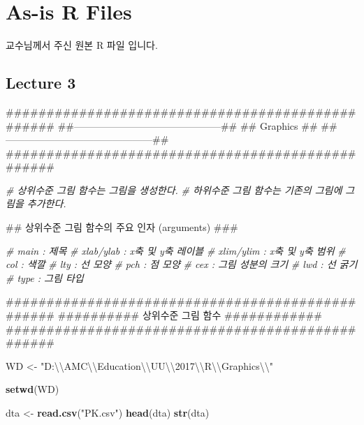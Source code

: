 \documentclass[11pt,]{krantz}
\makeatletter
\newenvironment{Shaded}{\begin{snugshade}}{\end{snugshade}}
\newcommand{\KeywordTok}[1]{\textcolor[rgb]{0.13,0.29,0.53}{\textbf{#1}}}
\newcommand{\CharTok}[1]{\textcolor[rgb]{0.31,0.60,0.02}{#1}}
\newcommand{\StringTok}[1]{\textcolor[rgb]{0.31,0.60,0.02}{#1}}
\newcommand{\CommentTok}[1]{\textcolor[rgb]{0.56,0.35,0.01}{\textit{#1}}}
\newcommand{\AlertTok}[1]{\textcolor[rgb]{0.94,0.16,0.16}{#1}}
\newcommand{\NormalTok}[1]{#1}
\newenvironment{kframe}{%
\medskip{}
\setlength{\fboxsep}{.8em}
 \def\at@end@of@kframe{}%
 \ifinner\ifhmode%
  \def\at@end@of@kframe{\end{minipage}}%
  \begin{minipage}{\columnwidth}%
 \fi\fi%
 \def\FrameCommand##1{\hskip\@totalleftmargin \hskip-\fboxsep
 \colorbox{shadecolor}{##1}\hskip-\fboxsep
     \hskip-\linewidth \hskip-\@totalleftmargin \hskip\columnwidth}%
 \MakeFramed {\advance\hsize-\width
   \@totalleftmargin\z@ \linewidth\hsize
   \@setminipage}}%
 {\par\unskip\endMakeFramed%
 \at@end@of@kframe}
\renewenvironment{Shaded}{\begin{kframe}}{\end{kframe}}
\theoremstyle{definition}
\theoremstyle{definition}
\theoremstyle{remark}
\makeatother
\begin{document}
\cleardoublepage 

\appendix {}


\chapter{As-is R Files}\label{as-is-r-files}

교수님께서 주신 원본 R 파일 입니다.

\section{Lecture 3}\label{lecture-3}

\begin{Shaded}
\begin{Highlighting}[]
\NormalTok{#################################################}
\NormalTok{##---------------------------------------------##}
\NormalTok{##                  Graphics                   ##}
\NormalTok{##---------------------------------------------##}
\NormalTok{#################################################}

\CommentTok{# 상위수준 그림 함수는 그림을 생성한다.}
\CommentTok{# 하위수준 그림 함수는 기존의 그림에 그림을 추가한다.}

\NormalTok{## 상위수준 그림 함수의 주요 인자 (arguments) }\AlertTok{###}

\CommentTok{# main : 제목}
\CommentTok{# xlab/ylab : x축 및 y축 레이블}
\CommentTok{# xlim/ylim : x축 및 y축 범위}
\CommentTok{# col : 색깔}
\CommentTok{# lty : 선 모양}
\CommentTok{# pch : 점 모양}
\CommentTok{# cex : 그림 성분의 크기}
\CommentTok{# lwd : 선 굵기}
\CommentTok{# type : 그림 타입}


\NormalTok{#################################################}
\NormalTok{##########     상위수준 그림 함수    ############}
\NormalTok{#################################################}

\NormalTok{WD <-}\StringTok{ "D:}\CharTok{\textbackslash{}\textbackslash{}}\StringTok{AMC}\CharTok{\textbackslash{}\textbackslash{}}\StringTok{Education}\CharTok{\textbackslash{}\textbackslash{}}\StringTok{UU}\CharTok{\textbackslash{}\textbackslash{}}\StringTok{2017}\CharTok{\textbackslash{}\textbackslash{}}\StringTok{R}\CharTok{\textbackslash{}\textbackslash{}}\StringTok{Graphics}\CharTok{\textbackslash{}\textbackslash{}}\StringTok{"}

\KeywordTok{setwd}\NormalTok{(WD)}

\NormalTok{dta <-}\StringTok{ }\KeywordTok{read.csv}\NormalTok{(}\StringTok{"PK.csv"}\NormalTok{)}
\KeywordTok{head}\NormalTok{(dta)}
\KeywordTok{str}\NormalTok{(dta)}


\end{Highlighting}
\end{Shaded}
\end{document}
